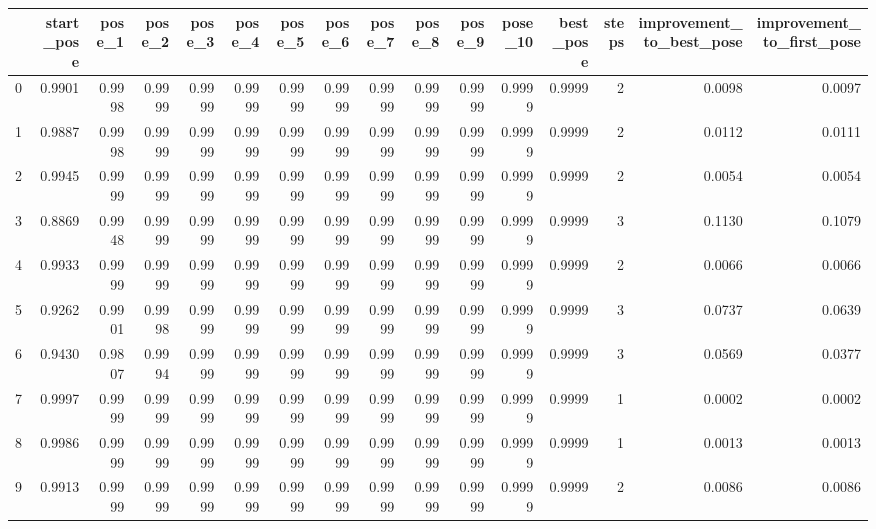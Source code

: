 \begin{tabular}{lrrrrrrrrrrrrrrr}
\toprule
{} &  start\_pose &  pose\_1 &  pose\_2 &  pose\_3 &  pose\_4 &  pose\_5 &  pose\_6 &  pose\_7 &  pose\_8 &  pose\_9 &  pose\_10 &  best\_pose &  steps &  improvement\_to\_best\_pose &  improvement\_to\_first\_pose \\
\midrule
0  &      0.9901 &  0.9998 &  0.9999 &  0.9999 &  0.9999 &  0.9999 &  0.9999 &  0.9999 &  0.9999 &  0.9999 &   0.9999 &     0.9999 &      2 &                    0.0098 &                     0.0097 \\
1  &      0.9887 &  0.9998 &  0.9999 &  0.9999 &  0.9999 &  0.9999 &  0.9999 &  0.9999 &  0.9999 &  0.9999 &   0.9999 &     0.9999 &      2 &                    0.0112 &                     0.0111 \\
2  &      0.9945 &  0.9999 &  0.9999 &  0.9999 &  0.9999 &  0.9999 &  0.9999 &  0.9999 &  0.9999 &  0.9999 &   0.9999 &     0.9999 &      2 &                    0.0054 &                     0.0054 \\
3  &      0.8869 &  0.9948 &  0.9999 &  0.9999 &  0.9999 &  0.9999 &  0.9999 &  0.9999 &  0.9999 &  0.9999 &   0.9999 &     0.9999 &      3 &                    0.1130 &                     0.1079 \\
4  &      0.9933 &  0.9999 &  0.9999 &  0.9999 &  0.9999 &  0.9999 &  0.9999 &  0.9999 &  0.9999 &  0.9999 &   0.9999 &     0.9999 &      2 &                    0.0066 &                     0.0066 \\
5  &      0.9262 &  0.9901 &  0.9998 &  0.9999 &  0.9999 &  0.9999 &  0.9999 &  0.9999 &  0.9999 &  0.9999 &   0.9999 &     0.9999 &      3 &                    0.0737 &                     0.0639 \\
6  &      0.9430 &  0.9807 &  0.9994 &  0.9999 &  0.9999 &  0.9999 &  0.9999 &  0.9999 &  0.9999 &  0.9999 &   0.9999 &     0.9999 &      3 &                    0.0569 &                     0.0377 \\
7  &      0.9997 &  0.9999 &  0.9999 &  0.9999 &  0.9999 &  0.9999 &  0.9999 &  0.9999 &  0.9999 &  0.9999 &   0.9999 &     0.9999 &      1 &                    0.0002 &                     0.0002 \\
8  &      0.9986 &  0.9999 &  0.9999 &  0.9999 &  0.9999 &  0.9999 &  0.9999 &  0.9999 &  0.9999 &  0.9999 &   0.9999 &     0.9999 &      1 &                    0.0013 &                     0.0013 \\
9  &      0.9913 &  0.9999 &  0.9999 &  0.9999 &  0.9999 &  0.9999 &  0.9999 &  0.9999 &  0.9999 &  0.9999 &   0.9999 &     0.9999 &      2 &                    0.0086 &                     0.0086 \\

\end{tabular}
